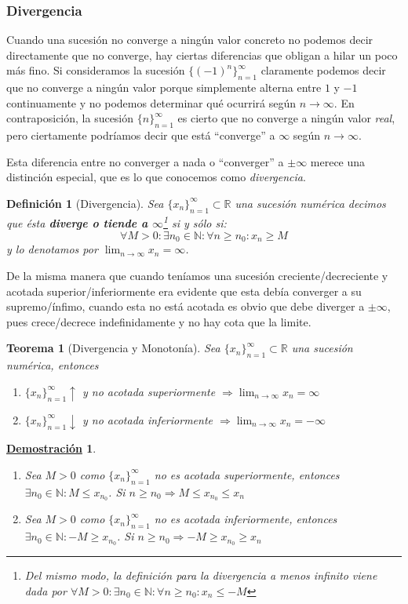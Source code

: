 \documentclass[10pt,a4paper,openright]{book}
\theoremstyle{break}
\newtheorem{defi}{Definición}[chapter]
\newtheorem{theo}{Teorema}[chapter]
\newtheorem*{demo}{\underline{Demostración}}
\begin{document}
\subsubsection{Divergencia}
Cuando una sucesión no converge a ningún valor concreto no podemos decir directamente que no converge, hay ciertas diferencias que obligan a hilar un poco más fino. Si consideramos la sucesión $\{(-1)^n\}_{n=1}^\infty$ claramente podemos decir que no converge a ningún valor porque simplemente alterna entre $1$ y $-1$ continuamente y no podemos determinar qué ocurrirá según $n\rightarrow \infty$. En contraposición, la sucesión $\{n\}_{n=1}^\infty$ es cierto que no converge a ningún valor \textit{real}, pero ciertamente podríamos decir que está ``converge'' a $\infty$ según $n\rightarrow\infty$.

Esta diferencia entre no converger a nada o ``converger'' a $\pm\infty$ merece una distinción especial, que es lo que conocemos como \textit{divergencia}.

\begin{defi}[Divergencia]
Sea $\{x_n\}_{n=1}^\infty\subset \mathbb R$ una sucesión numérica decimos que ésta \textbf{diverge o tiende a $\infty$}\footnote{Del mismo modo, la definición para la divergencia a menos infinito viene dada por $\forall M>0: \exists n_0\in \mathbb N: \forall n \geq n_0: x_n\leq -M$} si y sólo si:
\[
\forall M>0: \exists n_0\in \mathbb N: \forall n \geq n_0: x_n\geq M
\]
y lo denotamos por $\lim_{n\rightarrow\infty} x_n = \infty$.
\end{defi}

De la misma manera que cuando teníamos una sucesión creciente/decreciente y acotada superior/inferiormente era evidente que esta debía converger a su supremo/ínfimo, cuando esta no está acotada es obvio que debe diverger a $\pm\infty$, pues crece/decrece indefinidamente y no hay cota que la limite.

\begin{theo}[Divergencia y Monotonía]
Sea $\{x_n\}_{n=1}^\infty\subset \mathbb R$ una sucesión numérica, entonces
\begin{enumerate}
\item $\{x_n\}_{n=1}^\infty \uparrow$ y no acotada superiormente $\Rightarrow \lim_{n\rightarrow \infty} x_n=\infty$

\item $\{x_n\}_{n=1}^\infty \downarrow$ y no acotada inferiormente $\Rightarrow \lim_{n\rightarrow \infty} x_n=-\infty$
\end{enumerate}
\end{theo}
\begin{demo}
\begin{enumerate}
\item Sea $M>0$ como $\{x_n\}_{n=1}^\infty $ no es acotada superiormente, entonces $\exists n_0\in \mathbb N: M\leq x_{n_0}$. Si $n\geq n_0\Rightarrow M\leq x_{n_0}\leq x_n$

\item Sea $M>0$ como $\{x_n\}_{n=1}^\infty $ no es acotada inferiormente, entonces $\exists n_0\in \mathbb N: -M\geq x_{n_0}$. Si $n\geq n_0\Rightarrow -M\geq x_{n_0}\geq x_n$
\end{enumerate}
\end{demo}
\end{document}
